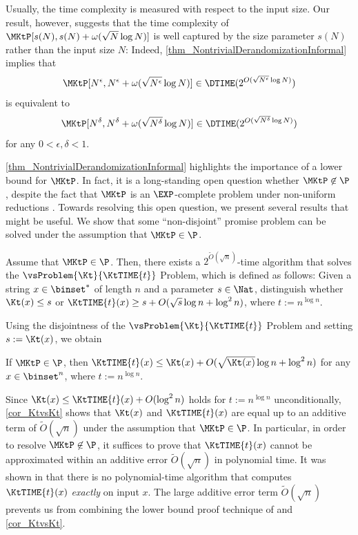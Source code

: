 \documentclass{toc}
\begin{document}
Usually, the time complexity is measured with respect to the input size.
Our result, however, suggests that
the time complexity of $\MKtP[s(N), s(N) + {\omega}(\sqrt{N} \log N)]$ is well captured by the size parameter $s(N)$ rather than the input size $N$:
Indeed,
\cref{thm_NontrivialDerandomizationInformal} implies that
$$\MKtP[N^{\epsilon}, N^{\epsilon} + \omega( \sqrt{N^{\epsilon}} \log N )] \in \DTIME(2^{O( \sqrt{N^{\epsilon}} \log N )})$$
is equivalent to
$$\MKtP[N^{\delta}, N^{\delta} + \omega( \sqrt{N^{\delta}} \log N )] \in \DTIME(2^{O( \sqrt{N^{\delta}} \log N )})$$
for any $0 < \epsilon, \delta < 1$.


%
%
%
%

\cref{thm_NontrivialDerandomizationInformal} highlights the importance of a lower bound for $\MKtP$.
In fact,
it is a long-standing open question whether $\MKtP \not\in \P$, despite the fact that $\MKtP$ is an $\EXP$-complete problem under non-uniform reductions \cite{AllenderBKMR06_siamcomp_journals}.
Towards resolving this open question,
we present several results that might be useful.
We show that
some ``non-disjoint'' promise problem can be solved
under the assumption that $\MKtP \in \P$.
\begin{theorem}
  \label{thm_KtvsKt}
  Assume that $\MKtP \in \P$.
  Then, there exists a $2^{\widetilde{O}(\sqrt{n})}$-time algorithm that solves the $\vsProblem{\Kt}{\KtTIME{t}}$ Problem, which is defined as follows:
  Given a string $x \in \binset^*$ of length $n$ and a parameter $s \in \Nat$,
  distinguish whether
  $\Kt(x) \le s$
  or
  $\KtTIME{t}(x) \ge s + O(\sqrt{s} \log n + \log^2 n)$,
  where $t := n^{\log n}$.
\end{theorem}
Using the disjointness of the $\vsProblem{\Kt}{\KtTIME{t}}$ Problem and setting $s := \Kt(x)$, we obtain
\begin{corollary}
  \label{cor_KtvsKt}
  If $\MKtP \in \P$,
  then
  $\KtTIME{t}(x) \le \Kt(x) + O(\sqrt{\Kt(x)} \log n + \log^2 n)$
  for any $x \in \binset^n$,
  where  $t := n^{\log n}$.
\end{corollary}

Since $\Kt(x) \le \KtTIME{t}(x) + O(\log^2 n)$ holds for $t := n^{\log n}$ unconditionally,
\cref{cor_KtvsKt} shows that
$\Kt(x)$ and $\KtTIME{t}(x)$ are
equal up to an additive term of $\widetilde{O}(\sqrt{n})$
under the assumption that $\MKtP \in \P$.
In particular,
in order to resolve $\MKtP \not\in \P$,
it suffices to prove that
$\KtTIME{t}(x)$ cannot be approximated
within an additive error $\widetilde{O}(\sqrt{n})$
in polynomial time.
It was shown in \cite{Hirahara20_stoc_conf} that
there is no polynomial-time algorithm
that computes
$\KtTIME{t}(x)$ \emph{exactly} on input $x$.
The large additive error term $\widetilde{O}(\sqrt{n})$ prevents us from combining the lower bound proof technique of \cite{Hirahara20_stoc_conf} and \cref{cor_KtvsKt}.
\end{document}
